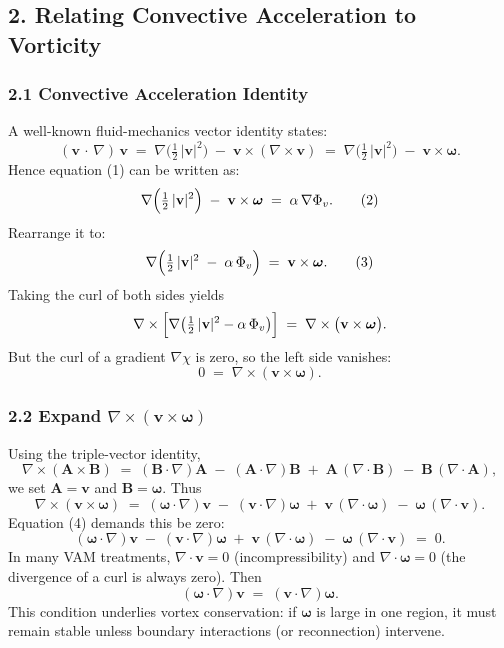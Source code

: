 \subsection*{2. Relating Convective Acceleration to Vorticity}

\subsubsection*{2.1 Convective Acceleration Identity}
A well-known fluid-mechanics vector identity states:
\[
    (\mathbf{v}\,\cdot\,\nabla)\,\mathbf{v}
    \;=\;
    \nabla\!\bigl(\tfrac12\,|\mathbf{v}|^2\bigr)
    \;-\;
    \mathbf{v}\times(\nabla\times \mathbf{v})
    \;=\;
    \nabla\bigl(\tfrac12\,|\mathbf{v}|^2\bigr)
    \;-\;
    \mathbf{v}\times \boldsymbol{\omega}.
\]
Hence equation (1) can be written as:
\[
    \nabla
    \Bigl(
    \tfrac12 \,\lvert \mathbf{v}\rvert^2
    \Bigr)
    \;-\;
    \mathbf{v}\times \boldsymbol{\omega}
    \;=\;
    \alpha \,\nabla \Phi_v.
    \tag{2}
\]
Rearrange it to:
\[
    \nabla
    \Bigl(
    \tfrac12\,|\mathbf{v}|^2
    \;-\;
    \alpha\,\Phi_v
    \Bigr)
    \;=\;
    \mathbf{v}\times \boldsymbol{\omega}.
    \tag{3}
\]
Taking the curl of both sides yields
\[
    \nabla \times \Bigl[
        \nabla\bigl(
        \tfrac12\,|\mathbf{v}|^2 - \alpha\,\Phi_v
        \bigr)
        \Bigr]
    \;=\;
    \nabla \times \bigl(\mathbf{v}\times \boldsymbol{\omega}\bigr).
\]
But the curl of a gradient \(\nabla \chi\) is zero, so the left side vanishes:
\[
    0
    \;=\;
    \nabla \times (\mathbf{v}\times \boldsymbol{\omega}).
    \tag{4}
\]

\subsubsection*{2.2 Expand \(\nabla \times (\mathbf{v}\times \boldsymbol{\omega})\)}
Using the triple-vector identity,
\[
    \nabla \times (\mathbf{A}\times \mathbf{B})
    \;=\;
    (\mathbf{B}\cdot\nabla)\mathbf{A}
    \;-\;
    (\mathbf{A}\cdot\nabla)\mathbf{B}
    \;+\;
    \mathbf{A}\,(\nabla\cdot \mathbf{B})
    \;-\;
    \mathbf{B}\,(\nabla\cdot \mathbf{A}),
\]
we set \(\mathbf{A} = \mathbf{v}\) and \(\mathbf{B} = \boldsymbol{\omega}\). Thus
\[
    \nabla \times (\mathbf{v}\times \boldsymbol{\omega})
    \;=\;
    (\boldsymbol{\omega}\cdot \nabla)\mathbf{v}
    \;-\;
    (\mathbf{v}\cdot \nabla)\boldsymbol{\omega}
    \;+\;
    \mathbf{v}\,(\nabla\cdot \boldsymbol{\omega})
    \;-\;
    \boldsymbol{\omega}\,(\nabla\cdot \mathbf{v}).
\]
Equation (4) demands this be zero:
\[
    (\boldsymbol{\omega}\cdot \nabla)\mathbf{v}
    \;-\;
    (\mathbf{v}\cdot \nabla)\boldsymbol{\omega}
    \;+\;
    \mathbf{v}\,(\nabla\cdot \boldsymbol{\omega})
    \;-\;
    \boldsymbol{\omega}\,(\nabla\cdot \mathbf{v})
    \;=\;
    0.
    \tag{5}
\]
In many VAM treatments, \(\nabla \cdot \mathbf{v} = 0\) (incompressibility) and \(\nabla \cdot \boldsymbol{\omega} = 0\) (the divergence of a curl is always zero). Then
\[
    (\boldsymbol{\omega}\cdot \nabla)\mathbf{v}
    \;=\;
    (\mathbf{v}\cdot \nabla)\boldsymbol{\omega}.
    \tag{6}
\]
This condition underlies vortex conservation: if \(\boldsymbol{\omega}\) is large in one region, it must remain stable unless boundary interactions (or reconnection) intervene.


